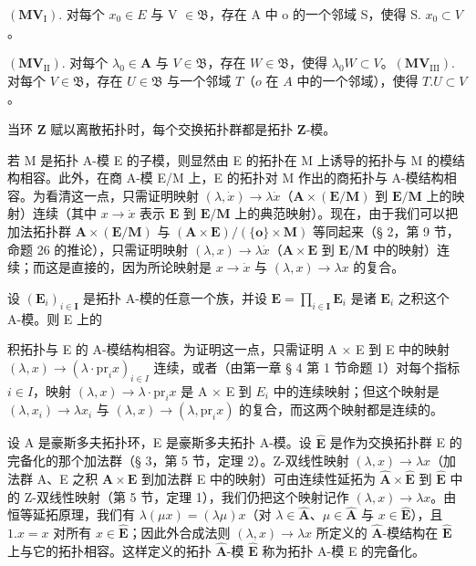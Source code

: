 \((\mathbf{MV}_{\mathrm{I}})\). 对每个 \(x_0 \in E\) 与 V \(\in \mathfrak{B}\)，存在 A 中 o 的一个邻域 S，使得 S. \(x_0 \subset V\)。

\((\mathbf{MV}_{\mathrm{II}})\). 对每个 \(\lambda_0 \in \mathbf{A}\) 与 \(V \in \mathfrak{B}\)，存在 \(W \in \mathfrak{B}\)，使得 \(\lambda_0 W \subset V\)。\((\mathbf{MV}_{\mathrm{III}})\). 对每个 \(V \in \mathfrak{B}\)，存在 \(U \in \mathfrak{B}\) 与一个邻域 \(T\)（\(o\) 在 \(A\) 中的一个邻域），使得 \(T. U \subset V\)。

当环 \(\mathbf{Z}\) 赋以离散拓扑时，每个交换拓扑群都是拓扑 \(\mathbf{Z}\)-模。

若 M 是拓扑 A-模 E 的子模，则显然由 E 的拓扑在 M 上诱导的拓扑与 M 的模结构相容。此外，在商 A-模 E/M 上，E 的拓扑对 M 作出的商拓扑与 A-模结构相容。为看清这一点，只需证明映射 \((\lambda, \dot{x}) \to \lambda \dot{x}\)（\(\mathbf{A} \times (\mathbf{E} / \mathbf{M})\) 到 \(\mathbf{E} / \mathbf{M}\) 上的映射）连续（其中 \(x \to \dot{x}\) 表示 \(\mathbf{E}\) 到 \(\mathbf{E} / \mathbf{M}\) 上的典范映射）。现在，由于我们可以把加法拓扑群 \(\mathbf{A} \times (\mathbf{E} / \mathbf{M})\) 与 \((\mathbf{A} \times \mathbf{E}) / (\{\mathbf{o}\} \times \mathbf{M})\) 等同起来（§ 2，第 9 节，命题 26 的推论），只需证明映射 \((\lambda, x) \to \lambda \dot{x}\)（\(\mathbf{A} \times \mathbf{E}\) 到 \(\mathbf{E} / \mathbf{M}\) 中的映射）连续；而这是直接的，因为所论映射是 \(x \to \dot{x}\) 与 \((\lambda, x) \to \lambda x\) 的复合。

设 \((\mathbf{E}_i)_{i\in \mathbf{I}}\) 是拓扑 A-模的任意一个族，并设 \(\mathbf{E} = \prod_{i\in \mathbf{I}}\mathbf{E}_i\) 是诸 \(\mathbf{E}_i\) 之积这个 A-模。则 E 上的

积拓扑与 E 的 A-模结构相容。为证明这一点，只需证明 A × E 到 E 中的映射 \((\lambda, x) \to (\lambda \cdot \text{pr}_i x)_{i \in I}\) 连续，或者（由第一章 § 4 第 1 节命题 1）对每个指标 \(i \in I\)，映射 \((\lambda, x) \to \lambda \cdot \text{pr}_i x\) 是 A × E 到 \(E_i\) 中的连续映射；但这个映射是 \((\lambda, x_i) \to \lambda x_i\) 与 \((\lambda, x) \to (\lambda, \text{pr}_i x)\) 的复合，而这两个映射都是连续的。

设 A 是豪斯多夫拓扑环，E 是豪斯多夫拓扑 A-模。设 \(\hat{\mathbf{E}}\) 是作为交换拓扑群 E 的完备化的那个加法群（§ 3，第 5 节，定理 2）。Z-双线性映射 \((\lambda, x) \to \lambda x\)（加法群 A、E 之积 \(\mathbf{A} \times \mathbf{E}\) 到加法群 E 中的映射）可由连续性延拓为 \(\hat{\mathbf{A}} \times \hat{\mathbf{E}}\) 到 \(\hat{\mathbf{E}}\) 中的 Z-双线性映射（第 5 节，定理 1），我们仍把这个映射记作 \((\lambda, x) \to \lambda x\)。由恒等延拓原理，我们有 \(\lambda(\mu x) = (\lambda \mu)x\)（对 \(\lambda \in \hat{\mathbf{A}}\)、\(\mu \in \hat{\mathbf{A}}\) 与 \(x \in \hat{\mathbf{E}}\)），且 \(1.x = x\) 对所有 \(x \in \hat{\mathbf{E}}\)；因此外合成法则 \((\lambda, x) \to \lambda x\) 所定义的 \(\hat{\mathbf{A}}\)-模结构在 \(\hat{\mathbf{E}}\) 上与它的拓扑相容。这样定义的拓扑 \(\hat{\mathbf{A}}\)-模 \(\hat{\mathbf{E}}\) 称为拓扑 A-模 E 的完备化。

